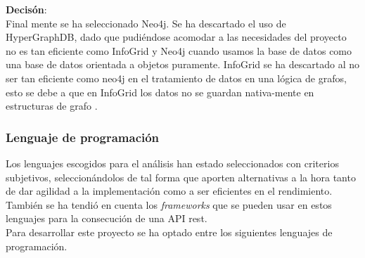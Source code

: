 \documentclass[12pt]{article} %
\begin{document}
\textbf{Decisón}:\\
Final mente se ha seleccionado Neo4j. Se ha descartado el uso de HyperGraphDB, dado que pudiéndose acomodar a las necesidades del proyecto no es tan eficiente como InfoGrid y Neo4j cuando usamos la base de datos como una base de datos orientada a objetos puramente.
InfoGrid se ha descartado al no ser tan eficiente como neo4j en el tratamiento de datos en una lógica de grafos, esto se debe a que en InfoGrid los datos no se guardan nativa-mente en estructuras de grafo \cite{neo4jvsinfogrid}.

\subsubsection{Lenguaje de programación}
Los lenguajes escogidos para el análisis han estado seleccionados con criterios subjetivos, seleccionándolos de tal forma que aporten alternativas a la hora tanto de dar agilidad a la implementación como a ser eficientes en el rendimiento. También se ha tendió en cuenta los \textit{frameworks} que se pueden usar en estos lenguajes para la consecución de una API rest.\\Para desarrollar este proyecto se ha optado entre los siguientes lenguajes de programación.
\end{document}
